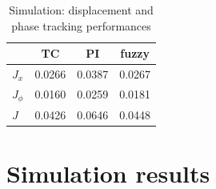 \documentclass[preprint,12pt]{elsarticle}
\begin{document}
\begin{table}
    \centering
    \begin{tabular}{|l|c|c|c|} \hline
       \cellcolor{gray}  &  TC  & PI & fuzzy   \\  \hline 
      $J_x$ & 0.0266  & 0.0387  &  0.0267   \\  \hline 
      $J_\phi$  & 0.0160  & 0.0259  & 0.0181    \\ \hline 
       $J$ &  0.0426 & 0.0646  &   0.0448 \\ \hline 
    \end{tabular}
    \vspace{0.1cm}
    \caption{Simulation: displacement and phase tracking performances}
    \label{T_J_simulation}
\end{table}



\section{Simulation results}
\end{document}
